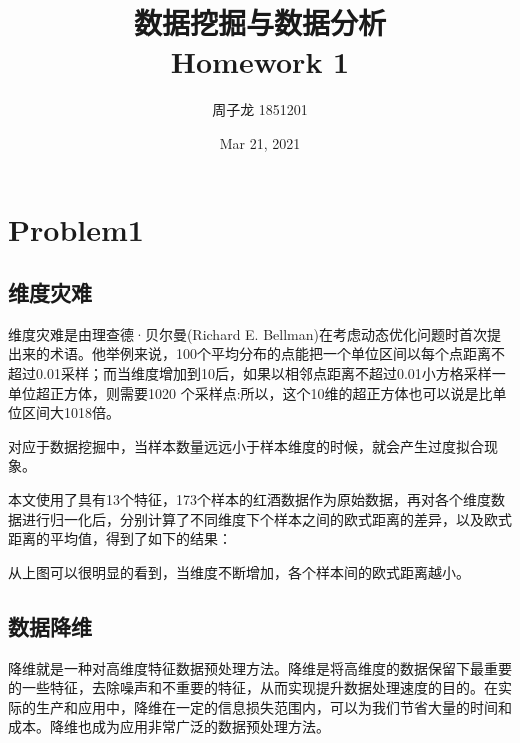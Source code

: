 \documentclass[UTF8]{ctexart}
\title{数据挖掘与数据分析\\Homework 1}
\author{周子龙 1851201}
\date{Mar 21, 2021}
\begin{document}
\maketitle
\section{Problem1}

\subsection{维度灾难}
维度灾难是由理查德·贝尔曼(Richard E. Bellman)在考虑动态优化问题时首次提出来的术语。他举例来说，100个平均分布的点能把一个单位区间以每个点距离不超过0.01采样；而当维度增加到10后，如果以相邻点距离不超过0.01小方格采样一单位超正方体，则需要1020 个采样点:所以，这个10维的超正方体也可以说是比单位区间大1018倍。

对应于数据挖掘中，当样本数量远远小于样本维度的时候，就会产生过度拟合现象。

本文使用了具有13个特征，173个样本的红酒数据作为原始数据，再对各个维度数据进行归一化后，分别计算了不同维度下个样本之间的欧式距离的差异，以及欧式距离的平均值，得到了如下的结果：

\begin{figure}[H]
	\centering
  	\centering
\end{figure}


从上图可以很明显的看到，当维度不断增加，各个样本间的欧式距离越小。


\subsection{数据降维}
降维就是一种对高维度特征数据预处理方法。降维是将高维度的数据保留下最重要的一些特征，去除噪声和不重要的特征，从而实现提升数据处理速度的目的。在实际的生产和应用中，降维在一定的信息损失范围内，可以为我们节省大量的时间和成本。降维也成为应用非常广泛的数据预处理方法。
\end{document}
